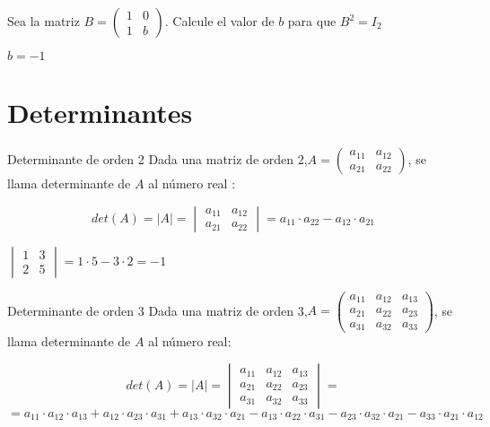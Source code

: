 \begin{ejer} Sea la matriz 
$B=\begin{pmatrix}
1 & 0 \\
1 & b
\end{pmatrix}$. 
Calcule el valor de $b$ para que $B^2=I_2$
\begin{solu}
$b=-1$
\end{solu}
\end{ejer}

\newpage

\section{Determinantes}

\begin{definicion}{Determinante de orden 2}
Dada una matriz de orden 2,$A=\begin{pmatrix}
a_{11}& a_{12}  \\
a_{21} & a_{22} 
\end{pmatrix}$, se llama determinante de $A$ al número real : 

\[ det(A)= |A|= \begin{vmatrix}
a_{11}& a_{12}  \\
a_{21} & a_{22} 
\end{vmatrix}=a_{11} \cdot a_{22}-a_{12}\cdot a_{21} \]
\end{definicion}

\begin{ejemplo}
   $\begin{vmatrix}
1& 3  \\
2 &5 
\end{vmatrix}=1\cdot 5-3\cdot 2=-1 $
\end{ejemplo}

\begin{definicion}{Determinante de orden 3}
Dada una matriz de orden 3,$A=\begin{pmatrix}
a_{11}& a_{12} & a_{13} \\
a_{21} & a_{22} & a_{23} \\
a_{31}& a_{32} & a_{33}
\end{pmatrix}$, se llama determinante de $A$ al número real: 

\[ det(A)= |A|= \begin{vmatrix}
a_{11}& a_{12}  &a_{13} \\
a_{21} & a_{22}&a_{23}\\
a_{31} & a_{32}&a_{33}
\end{vmatrix} = \]
\[ =a_{11} \cdot a_{12} \cdot a_{13}+a_{12} \cdot a_{23} \cdot a_{31}+a_{13} \cdot a_{32} \cdot a_{21}-a_{13} \cdot a_{22} \cdot a_{31}-a_{23} \cdot a_{32} \cdot a_{21}-a_{33} \cdot a_{21} \cdot a_{12} \]
\end{definicion}

